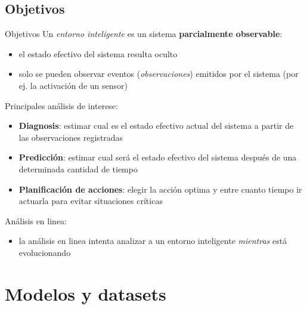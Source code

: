 \documentclass[9pt, handout]{beamer}
\begin{document}
    \subsection{Objetivos}
      \begin{frame}{Objetivos}
        \pause
        Un \textit{entorno inteligente} es un sistema \textbf{parcialmente observable}:
        \pause
        \begin{itemize}
          \item el estado efectivo del sistema resulta oculto
          \pause
          \item solo se pueden observar eventos (\textit{observaciones}) emitidos por el sistema (por ej. la activación de un sensor)\\[1em]
        \end{itemize}
        
        \pause
        
        Principales análisis de interese:
        \pause
        \begin{itemize}
          \item \textbf{Diagnosis}: estimar cual es el estado efectivo actual del sistema a partir de las observaciones registradas
          \pause
          \item \textbf{Predicción}: estimar cual será el estado efectivo del sistema después de una determinada cantidad de tiempo
          \item \textbf{Planificación de acciones}: elegir la acción optima y entre cuanto tiempo ir actuarla para evitar situaciones críticas\\[1em]
        \end{itemize}
        
        \pause
        
        Análisis en linea:
        \pause
        \begin{itemize}
          \item la análisis en linea intenta analizar a un entorno inteligente \textit{mientras} está evolucionando
        \end{itemize}
      \end{frame}
    
  \section{Modelos y datasets}
\end{document}
